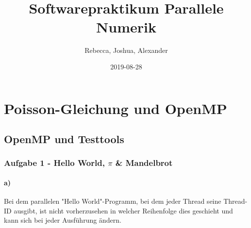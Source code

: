 \documentclass{report}
\title{Softwarepraktikum Parallele Numerik}
\date{2019-08-28}
\author{Rebecca, Joshua, Alexander}
\begin{document}
    \maketitle
        \newpage
    \tableofcontents
    \newpage
    \chapter{Poisson-Gleichung und OpenMP}
    \section{OpenMP und Testtools}
    \subsection{Aufgabe 1 - Hello World, $\pi$ \& Mandelbrot}
        \subsubsection{a)}
        Bei dem parallelen "Hello World"-Programm, bei dem jeder Thread seine Thread-ID ausgibt, ist nicht vorherzusehen in welcher Reihenfolge dies geschieht und kann sich bei jeder Ausführung ändern.
\end{document}

